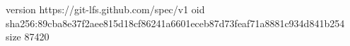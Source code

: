 version https://git-lfs.github.com/spec/v1
oid sha256:89cba8e37f2aee815d18cf86241a6601eceb87d73feaf71a8881c934d841b254
size 87420
